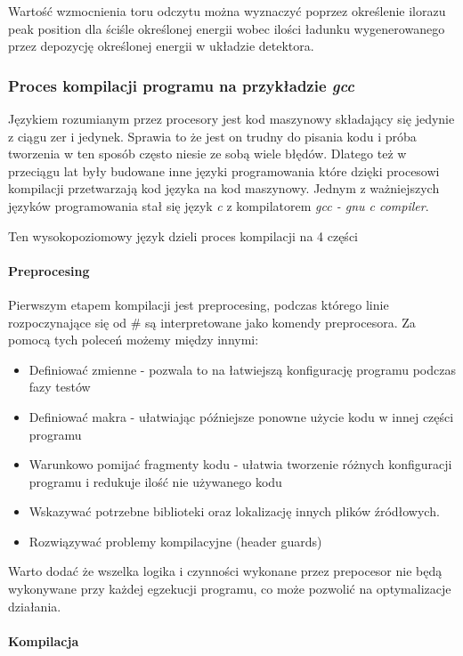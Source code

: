  Wartość wzmocnienia toru odczytu można wyznaczyć poprzez określenie ilorazu peak position dla ściśle określonej energii wobec ilości ładunku wygenerowanego przez depozycję określonej energii w układzie detektora. 


\subsubsection{Proces kompilacji programu na przykładzie \textit{gcc}}

Językiem rozumianym przez procesory jest kod maszynowy składający się jedynie z ciągu zer i jedynek.
Sprawia to że jest on trudny do pisania kodu i próba tworzenia w ten sposób często niesie ze sobą wiele błędów. 
Dlatego też w przeciągu lat były budowane inne języki programowania które dzięki procesowi kompilacji przetwarzają kod języka na kod maszynowy. 
Jednym z ważniejszych języków programowania stał się język \textit{c} z kompilatorem \textit{gcc - gnu c compiler}\cite{gcc}. 

Ten wysokopoziomowy język dzieli proces kompilacji na 4 części

\paragraph{Preprocesing}

Pierwszym etapem kompilacji jest preprocesing, podczas którego linie rozpoczynające się od \# są interpretowane jako komendy preprocesora.  
Za pomocą tych poleceń możemy między innymi:
\begin{itemize}
        \item Definiować zmienne - pozwala to na łatwiejszą konfigurację programu podczas fazy testów
        \item Definiować makra - ułatwiając późniejsze ponowne użycie kodu w innej części programu
        \item Warunkowo pomijać fragmenty kodu - ułatwia tworzenie różnych konfiguracji programu i redukuje ilość nie używanego kodu
        \item Wskazywać potrzebne biblioteki oraz lokalizację innych plików źródłowych.
        \item Rozwiązywać problemy kompilacyjne (header guards)
\end{itemize}
Warto dodać że wszelka logika i czynności wykonane przez prepocesor nie będą wykonywane przy każdej egzekucji programu, co może pozwolić na optymalizacje działania. 

\paragraph{Kompilacja}

